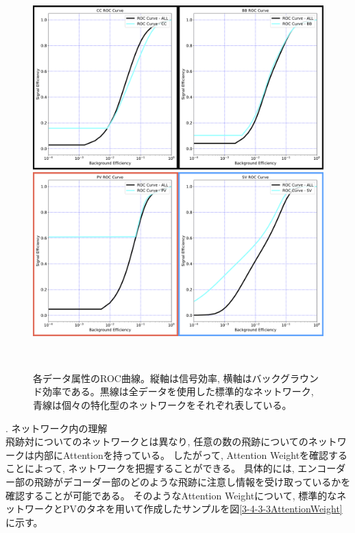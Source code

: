 \begin{figure}[htbp]
 \centering
  \begin{minipage}{1.0\textwidth}
   \centering
    \includegraphics[width=1.0\textwidth, clip]{Figure/3Networks/3-4-3-2ROCCurve_1.png}
   \end{minipage}
   
   \begin{minipage}{1.0\textwidth}
   \centering
    \includegraphics[width=1.0\textwidth, clip]{Figure/3Networks/3-4-3-2ROCCurve_2.png}
   \end{minipage}
  \caption[各データ属性のROC曲線]{各データ属性のROC曲線。縦軸は信号効率, 横軸はバックグラウンド効率である。黒線は全データを使用した標準的なネットワーク, 青線は個々の特化型のネットワークをそれぞれ表している。}
  \label{3-4-3-2EfficiencyCurve}
\end{figure}

. ネットワーク内の理解\\

飛跡対についてのネットワークとは異なり, 任意の数の飛跡についてのネットワークは内部にAttentionを持っている。
したがって, Attention Weightを確認することによって, ネットワークを把握することができる。
具体的には, エンコーダー部の飛跡がデコーダー部のどのような飛跡に注意し情報を受け取っているかを確認することが可能である。
そのようなAttention Weightについて, 標準的なネットワークとPVのタネを用いて作成したサンプルを図\ref{3-4-3-3AttentionWeight}に示す。

